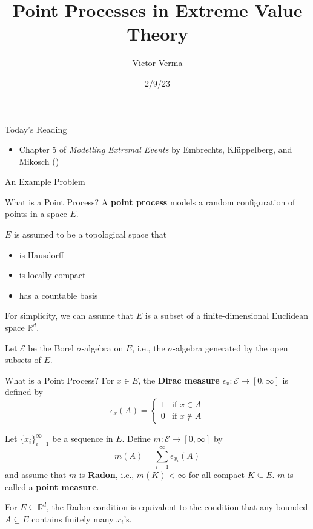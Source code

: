 \documentclass{beamer}
\title[Point Processes in Extreme Value Theory]{Point Processes in Extreme Value Theory}
\author{Victor Verma}
\institute[]
{
Prof. Yang Chen's Reading Group \\
Department of Statistics \\
University of Michigan
}
\date[2/9/23]{2/9/23}
\begin{document}
\begin{frame}
    \titlepage
\end{frame}

\begin{frame}{Today's Reading}
    \begin{itemize}
        \item Chapter 5 of \textit{Modelling Extremal Events} by Embrechts, Kl\"{u}ppelberg, and Mikosch (\cite{embrechts_et_al_1997})
    \end{itemize}
\end{frame}


\begin{frame}{An Example Problem}
\end{frame}

\begin{frame}{What is a Point Process?}
    A \textbf{point process} models a random configuration of points in a space $E$.

    \smallskip

    $E$ is assumed to be a topological space that
    \begin{itemize}
        \item is Hausdorff
        \item is locally compact
        \item has a countable basis
    \end{itemize}
    For simplicity, we can assume that $E$ is a subset of a finite-dimensional Euclidean space $\mathbb{R}^d$.

    \smallskip
    
    Let $\mathcal{E}$ be the Borel $\sigma$-algebra on $E$, i.e., the $\sigma$-algebra generated by the open subsets of $E$.
\end{frame}

\begin{frame}{What is a Point Process?}
    For $x \in E$, the \textbf{Dirac measure} $\epsilon_x : \mathcal{E} \to [0, \infty]$ is defined by
    \[
    \epsilon_x(A) =
        \begin{cases}
             1 & \text{if $x \in A$} \\
             0 & \text{if $x \notin A$}
        \end{cases}
    \]

    \smallskip

    Let $\{x_i\}_{i = 1}^{\infty}$ be a sequence in $E$. Define $m : \mathcal{E} \to [0, \infty]$ by
    \[
    m(A) = \sum_{i = 1}^{\infty} \epsilon_{x_i}(A)
    \]
    and assume that $m$ is \textbf{Radon}, i.e., $m(K) < \infty$ for all compact $K \subseteq E$. $m$ is called a \textbf{point measure}.

    \smallskip

    For $E \subseteq \mathbb{R}^d$, the Radon condition is equivalent to the condition that any bounded $A \subseteq E$ contains finitely many $x_i$'s.
\end{frame}
\end{document}
